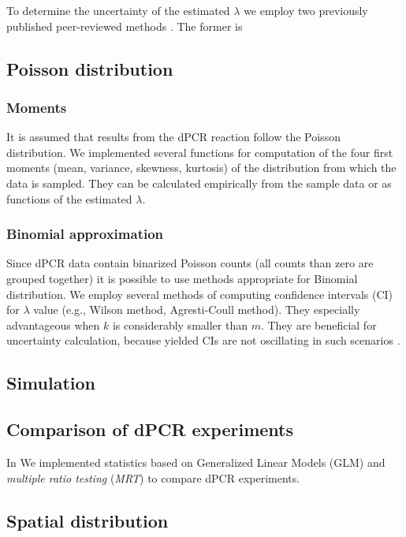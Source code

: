 \documentclass[a4,center,fleqn]{NAR}
\begin{document}
To determine the uncertainty of the estimated $\lambda$ we employ two 
previously 
published peer-reviewed methods \cite{dube_mathematical_2008, bhat_single_2009}.
The former is

\subsection{Poisson distribution}


\subsubsection{Moments}
It is assumed that results from the dPCR reaction follow the Poisson 
distribution. We implemented several functions for computation of the four 
first 
moments (mean, variance, skewness, kurtosis) of the distribution from which the 
data is sampled. They can be calculated empirically from the sample data or as 
functions of the estimated $\lambda$.

\subsubsection{Binomial approximation}
Since dPCR data contain binarized Poisson 
counts (all counts than zero are grouped together) it is possible to use 
methods 
appropriate for Binomial distribution. We employ several methods of computing 
confidence intervals (CI) for $\lambda$ value (e.g., Wilson method, 
Agresti-Coull method). They especially advantageous when $k$ is considerably 
smaller than $m$. They are beneficial for uncertainty calculation, because 
yielded CIs are not oscillating in such scenarios \cite{brown_2001}.

\subsection{Simulation}



\subsection{Comparison of dPCR experiments}

In \cite{Burdukiewicz_tba} We implemented statistics based on Generalized 
Linear 
Models (GLM) and \textit{multiple ratio testing} (\textit{MRT}) to compare dPCR 
experiments. 

\subsection{Spatial distribution}
\end{document}

